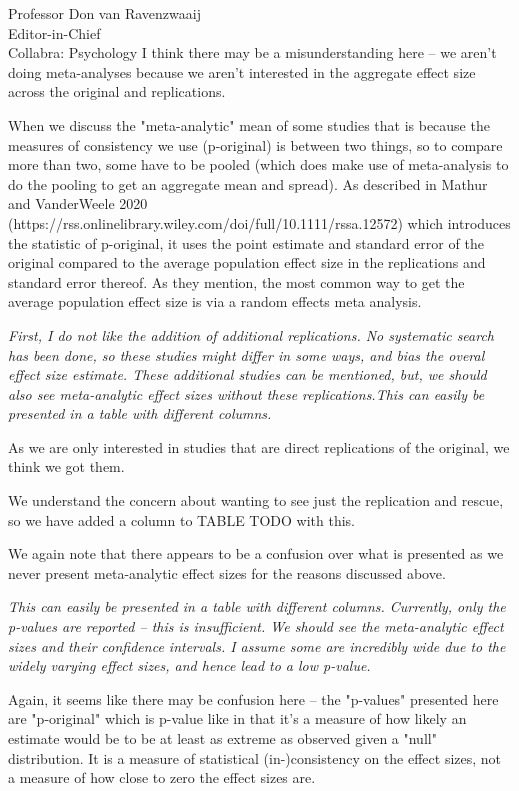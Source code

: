 \documentclass{stanfordletter}
\newcommand{\theysaid}[1]{\begin{leftbar} \noindent 
		\textsl{ #1}\end{leftbar}}
\begin{document}
\begin{letter}{Professor Don van Ravenzwaaij \\ Editor-in-Chief \\ Collabra: Psychology }
		I think there may be a misunderstanding here -- we aren't doing meta-analyses because we aren't interested in the aggregate effect size across the original and replications. 
		
		When we discuss the "meta-analytic" mean of some studies that is because the measures of consistency we use (p-original) is between two things, so to compare more than two, some have to be pooled (which does make use of meta-analysis to do the pooling to get an aggregate mean and spread). As described in Mathur and VanderWeele 2020 (https://rss.onlinelibrary.wiley.com/doi/full/10.1111/rssa.12572) which introduces the statistic of p-original, it uses the point estimate and standard error of the original compared to the average population effect size in the replications and standard error thereof. As they mention, the most common way to get the average population effect size is via a random effects meta analysis. 
		
		\theysaid{ First, I do not like the addition of additional replications. No systematic search has been done, so these studies might differ in some ways, and bias the overal effect size estimate. These additional studies can be mentioned, but, we should also see meta-analytic effect sizes without these replications.This can easily be presented in a table with different columns.}
		
		As we are only interested in studies that are direct replications of the original, we think we got them. 
		
		We understand the concern about wanting to see just the replication and rescue, so we have added a column to TABLE TODO with this. 
		
		We again note that there appears to be a confusion over what is presented as we never present meta-analytic effect sizes for the reasons discussed above. 
		
		 \theysaid{This can easily be presented in a table with different columns. Currently, only the p-values are reported – this is insufficient. We should see the meta-analytic effect sizes and their confidence intervals. I assume some are incredibly wide due to the widely varying effect sizes, and hence lead to a low p-value.}
		 
		 Again, it seems like there may be confusion here -- the "p-values" presented here are "p-original" which is p-value like in that it's a measure of how likely an estimate would be to be at least as extreme as observed given a "null" distribution. It is a measure of statistical (in-)consistency on the effect sizes, not a measure of how close to zero the effect sizes are. 
		 

\end{letter}
\end{document}
